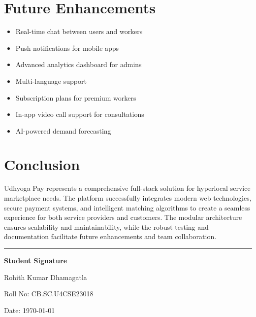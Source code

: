 \documentclass[12pt,a4paper]{article}
\begin{document}
\section*{Future Enhancements}

\begin{itemize}[leftmargin=*]
    \item Real-time chat between users and workers
    \item Push notifications for mobile apps
    \item Advanced analytics dashboard for admins
    \item Multi-language support
    \item Subscription plans for premium workers
    \item In-app video call support for consultations
    \item AI-powered demand forecasting
\end{itemize}

\section*{Conclusion}

Udhyoga Pay represents a comprehensive full-stack solution for hyperlocal service marketplace needs. The platform successfully integrates modern web technologies, secure payment systems, and intelligent matching algorithms to create a seamless experience for both service providers and customers. The modular architecture ensures scalability and maintainability, while the robust testing and documentation facilitate future enhancements and team collaboration.

\vspace{1cm}

\begin{center}
\rule{0.5\textwidth}{0.4pt}

\vspace{0.5cm}

\textbf{Student Signature}

\vspace{0.3cm}

Rohith Kumar Dhamagatla

Roll No: CB.SC.U4CSE23018

\vspace{0.5cm}

Date: \today
\end{center}
\end{document}
